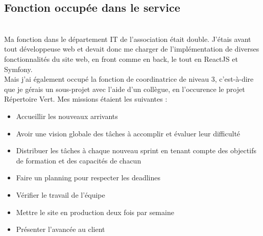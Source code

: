 \pagebreak

\subsection{Fonction occupée dans le service}
~\\
Ma fonction dans le département IT de l'association était double. 
J'étais avant tout développeuse web et devait donc me charger de l'implémentation de diverses fonctionnalités du site web, en front comme en back, le tout en ReactJS et Symfony.
\\
Mais j'ai également occupé la fonction de coordinatrice de niveau 3, 
c'est-à-dire que je gérais un sous-projet avec l'aide d'un collègue, en l'occurence le projet Répertoire Vert. Mes missions étaient les suivantes :
\begin{itemize}
    \item Accueillir les nouveaux arrivants
    \item Avoir une vision globale des tâches à accomplir et évaluer leur difficulté
    \item Distribuer les tâches à chaque nouveau sprint en tenant compte des objectifs de formation et des capacités de chacun
    \item Faire un planning pour respecter les deadlines
    \item Vérifier le travail de l'équipe
    \item Mettre le site en production deux fois par semaine
    \item Présenter l'avancée au client
\end{itemize}






